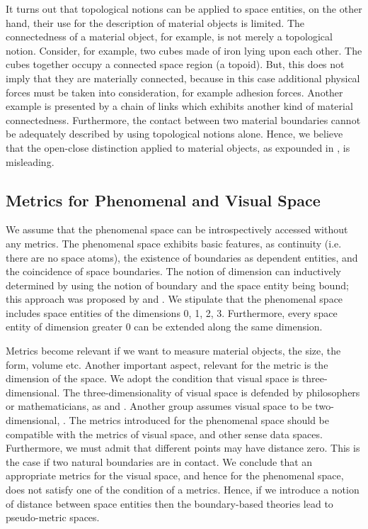 \documentclass{ao2e}
\begin{document}
{It turns out that topological notions can
be applied to space entities, on the other hand, their use for the description of material objects is limited. The connectedness of a material object, for example,  is not merely a topological notion. Consider, for example, two cubes made of iron lying upon each other.
The cubes together occupy a connected space region (a topoid). But, this does not imply that they are materially connected, because in this case additional physical forces must be taken into consideration, for example
adhesion forces. Another example is presented by a chain of links which exhibits another kind of material connectedness. Furthermore, the contact between two material boundaries cannot be adequately described by using topological notions alone.  
Hence, we believe that the open-close distinction applied to material objects, as expounded in \cite{smith-b-2000-a}, is misleading.

\subsection{Metrics for Phenomenal and Visual Space}
We assume that the phenomenal space can be introspectively accessed without any metrics. The phenomenal space exhibits basic features, as continuity (i.e. there are no space atoms), the existence of boundaries as dependent entities, and the coincidence of space boundaries. The notion of dimension can inductively determined by using the notion of boundary and the space entity being bound; this approach was proposed by \cite{menger-k-1943-a} and \cite{poincare-h-1963-a}.    We stipulate that the phenomenal space includes space entities of the dimensions 0, 1, 2, 3. Furthermore, every space entity of dimension greater 0  can be extended along the same dimension.

Metrics become relevant if we want to measure material objects, the size, the form, volume etc. Another important aspect, relevant for the metric is the dimension of the space. We adopt the condition that visual space is three-dimensional. The three-dimensionality
of visual space is defended by philosophers or mathematicians, as \cite{poincare-h-1963-a}  and \cite{luneburg-r-1950-a}. Another group assumes visual space to be two-dimensional, \cite{helmholtz-h-1962-a}. The metrics introduced for the phenomenal space should be compatible with the metrics of visual space, and other sense data spaces. Furthermore, we must admit that different points may have distance zero. This is the case if two natural boundaries are in contact. We conclude that an appropriate metrics for the visual space, and hence for the phenomenal space, does not satisfy one of the condition of a metrics. Hence, if we introduce a notion of distance between space entities then the boundary-based theories lead to pseudo-metric spaces.

}
\end{document}
